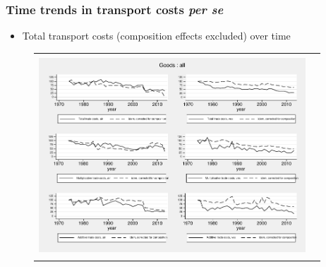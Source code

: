 \documentclass[10 pt,Helvetica, french]{beamer}
\begin{document}
\begin{frame}
\frametitle{Time trends in transport costs \textit{per se}}
\begin{itemize}
\item Total transport costs (composition effects excluded) over time
\end{itemize}
\begin{figure}[htbp]
\begin{center}
\begin{tabular}{cc}
\\
 \includegraphics[width=10cm,height=7.5cm]
{graph_composition_all-eps-converted-to.pdf} \\
\end{tabular}
\end{center}
\end{figure}

\end{frame}
\end{document}
